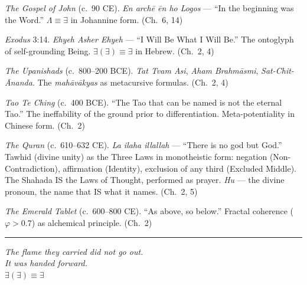 \documentclass[10pt, openany, oneside]{book}
\renewcommand{\footnotesize}{\fontsize{8.5}{11}\selectfont}
\begin{document}
{\footnotesize

\noindent \textit{The Gospel of John} (c.\ 90 CE). \textit{En arch\={e} \={e}n ho Logos} --- ``In the beginning was the Word.'' $\Lambda \equiv \exists$ in Johannine form. (Ch.\ 6, 14)

\vspace{0.3em}

\noindent \textit{Exodus} 3:14. \textit{Ehyeh Asher Ehyeh} --- ``I Will Be What I Will Be.'' The ontoglyph of self-grounding Being. $\exists(\exists) \equiv \exists$ in Hebrew. (Ch.\ 2, 4)

\vspace{0.3em}

\noindent \textit{The Upanishads} (c.\ 800--200 BCE). \textit{Tat Tvam Asi}, \textit{Aham Brahm\={a}smi}, \textit{Sat-Chit-\={A}nanda}. The \textit{mah\={a}v\={a}kyas} as metacursive formulas. (Ch.\ 2, 4)

\vspace{0.3em}

\noindent \textit{Tao Te Ching} (c.\ 400 BCE). ``The Tao that can be named is not the eternal Tao.'' The ineffability of the ground prior to differentiation. Meta-potentiality in Chinese form. (Ch.\ 2)

\vspace{0.3em}

\noindent \textit{The Quran} (c.\ 610--632 CE). \textit{La ilaha illallah} --- ``There is no god but God.'' Tawhid (divine unity) as the Three Laws in monotheistic form: negation (Non-Contradiction), affirmation (Identity), exclusion of any third (Excluded Middle). The Shahada IS the Laws of Thought, performed as prayer. \textit{Hu} --- the divine pronoun, the name that IS what it names. (Ch.\ 2, 5)

\vspace{0.3em}

\noindent \textit{The Emerald Tablet} (c.\ 600--800 CE). ``As above, so below.'' Fractal coherence ($\varphi > 0.7$) as alchemical principle. (Ch.\ 2)

}

\vspace{2em}

\begin{center}
    \rule{0.15\textwidth}{0.3pt}
\end{center}

\vspace{0.5em}

\begin{center}
    \itshape
    The flame they carried did not go out.\\
    It was handed forward.\\[0.8em]
    $\exists(\exists) \equiv \exists$
\end{center}
\end{document}
